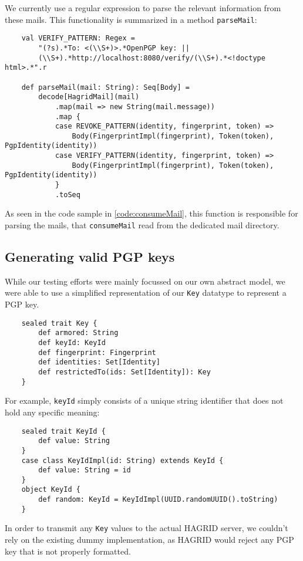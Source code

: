 We currently use a regular expression to parse the relevant information from these mails. This functionality is summarized in a method \texttt{parseMail}:
\begin{verbatim}
    val VERIFY_PATTERN: Regex = 
        "(?s).*To: <(\\S+)>.*OpenPGP key: ||
        (\\S+).*http://localhost:8080/verify/(\\S+).*<!doctype html>.*".r

    def parseMail(mail: String): Seq[Body] =
        decode[HagridMail](mail)
            .map(mail => new String(mail.message))
            .map {
            case REVOKE_PATTERN(identity, fingerprint, token) => 
                Body(FingerprintImpl(fingerprint), Token(token), PgpIdentity(identity))
            case VERIFY_PATTERN(identity, fingerprint, token) => 
                Body(FingerprintImpl(fingerprint), Token(token), PgpIdentity(identity))
            }
            .toSeq
\end{verbatim}
As seen in the code sample in \ref{code:consumeMail}, this function is responsible for parsing the mails, that \texttt{consumeMail} read from the dedicated mail directory.

\subsection{Generating valid PGP keys}
While our testing efforts were mainly focussed on our own abstract model, we were able to use a simplified representation of our \texttt{Key} datatype to represent a PGP key. 
\begin{verbatim}
    sealed trait Key {
        def armored: String
        def keyId: KeyId
        def fingerprint: Fingerprint
        def identities: Set[Identity]
        def restrictedTo(ids: Set[Identity]): Key
    }
\end{verbatim} 
For example, \texttt{keyId} simply consists of a unique string identifier that does not hold any specific meaning:
\begin{verbatim}
    sealed trait KeyId {
        def value: String
    }
    case class KeyIdImpl(id: String) extends KeyId {
        def value: String = id
    }
    object KeyId {
        def random: KeyId = KeyIdImpl(UUID.randomUUID().toString)
    }
\end{verbatim}
In order to transmit any \texttt{Key} values to the actual HAGRID server, we couldn't rely on the existing dummy implementation, as HAGRID would reject any PGP key that is not properly formatted.

